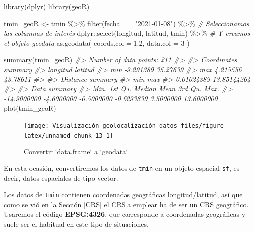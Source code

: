 \documentclass[
]{book}
\newenvironment{Shaded}{\begin{snugshade}}{\end{snugshade}}
\newcommand{\AttributeTok}[1]{\textcolor[rgb]{0.77,0.63,0.00}{#1}}
\newcommand{\CommentTok}[1]{\textcolor[rgb]{0.56,0.35,0.01}{\textit{#1}}}
\newcommand{\DecValTok}[1]{\textcolor[rgb]{0.00,0.00,0.81}{#1}}
\newcommand{\FunctionTok}[1]{\textcolor[rgb]{0.00,0.00,0.00}{#1}}
\newcommand{\NormalTok}[1]{#1}
\newcommand{\OtherTok}[1]{\textcolor[rgb]{0.56,0.35,0.01}{#1}}
\newcommand{\SpecialCharTok}[1]{\textcolor[rgb]{0.00,0.00,0.00}{#1}}
\newcommand{\StringTok}[1]{\textcolor[rgb]{0.31,0.60,0.02}{#1}}
\theoremstyle{definition}
\theoremstyle{definition}
\theoremstyle{definition}
\theoremstyle{definition}
\theoremstyle{remark}
\begin{document}
\begin{Shaded}
\begin{Highlighting}[]
\FunctionTok{library}\NormalTok{(dplyr)}
\FunctionTok{library}\NormalTok{(geoR)}

\NormalTok{tmin\_geoR }\OtherTok{\textless{}{-}}\NormalTok{ tmin }\SpecialCharTok{\%\textgreater{}\%}
  \FunctionTok{filter}\NormalTok{(fecha }\SpecialCharTok{==} \StringTok{"2021{-}01{-}08"}\NormalTok{) }\SpecialCharTok{\%\textgreater{}\%}
  \CommentTok{\# Seleccionamos las columnas de interés}
\NormalTok{  dplyr}\SpecialCharTok{::}\FunctionTok{select}\NormalTok{(longitud, latitud, tmin) }\SpecialCharTok{\%\textgreater{}\%}
  \CommentTok{\# Y creamos el objeto geodata}
  \FunctionTok{as.geodata}\NormalTok{(}
    \AttributeTok{coords.col =} \DecValTok{1}\SpecialCharTok{:}\DecValTok{2}\NormalTok{,}
    \AttributeTok{data.col =} \DecValTok{3}
\NormalTok{  )}


\FunctionTok{summary}\NormalTok{(tmin\_geoR)}
\CommentTok{\#\textgreater{} Number of data points: 211 }
\CommentTok{\#\textgreater{} }
\CommentTok{\#\textgreater{} Coordinates summary}
\CommentTok{\#\textgreater{}      longitud  latitud}
\CommentTok{\#\textgreater{} min {-}9.291389 35.27639}
\CommentTok{\#\textgreater{} max  4.215556 43.78611}
\CommentTok{\#\textgreater{} }
\CommentTok{\#\textgreater{} Distance summary}
\CommentTok{\#\textgreater{}         min         max }
\CommentTok{\#\textgreater{}  0.01024389 13.85144264 }
\CommentTok{\#\textgreater{} }
\CommentTok{\#\textgreater{} Data summary}
\CommentTok{\#\textgreater{}        Min.     1st Qu.      Median        Mean     3rd Qu.        Max. }
\CommentTok{\#\textgreater{} {-}14.9000000  {-}4.6000000  {-}0.5000000  {-}0.6293839   3.5000000  13.6000000}
\FunctionTok{plot}\NormalTok{(tmin\_geoR)}
\end{Highlighting}
\end{Shaded}

\begin{figure}

{\centering \texttt{[image: Visualización\_geolocalización\_datos\_files/figure-latex/unnamed-chunk-13-1]} 

}

\caption{Convertir `data.frame` a `geodata`}\label{fig:unnamed-chunk-13}
\end{figure}

En esta ocasión, convertiremos los datos de \texttt{tmin} en un objeto espacial \texttt{sf},
es decir, datos espaciales de tipo vector.

Los datos de \texttt{tmin} contienen coordenadas geográficas longitud/latitud, así que
como se vió en la Sección \ref{CRS} el CRS a emplear ha de ser un CRS
geográfico. Usaremos el código \textbf{EPSG:4326}, que corresponde a coordenadas
geográficas y suele ser el habitual en este tipo de situaciones.
\end{document}
